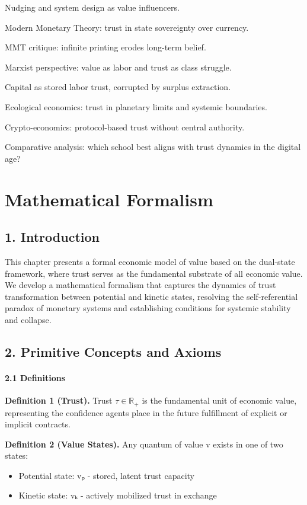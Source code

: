 \documentclass[11pt,oneside]{book}
\begin{document}
{{{{{{Nudging and system design as value influencers.

Modern Monetary Theory: trust in state sovereignty over currency.

MMT critique: infinite printing erodes long-term belief.

Marxist perspective: value as labor and trust as class struggle.

Capital as stored labor trust, corrupted by surplus extraction.

Ecological economics: trust in planetary limits and systemic boundaries.

Crypto-economics: protocol-based trust without central authority.

Comparative analysis: which school best aligns with trust dynamics in the digital age?



\appendix
\chapter{ Mathematical Formalism}

\section{1. Introduction}

This chapter presents a formal economic model of value based on the dual-state framework, where trust serves as the fundamental substrate of all economic value. We develop a mathematical formalism that captures the dynamics of trust transformation between potential and kinetic states, resolving the self-referential paradox of monetary systems and establishing conditions for systemic stability and collapse.

\section{2. Primitive Concepts and Axioms}

\subsubsection{2.1 Definitions}

\textbf{Definition 1 (Trust).} Trust $\tau \in \mathbb{R}_+$ is the fundamental unit of economic value, representing the confidence agents place in the future fulfillment of explicit or implicit contracts.

\textbf{Definition 2 (Value States).} Any quantum of value v exists in one of two states:
\begin{itemize}
\item Potential state: vₚ - stored, latent trust capacity
\item Kinetic state: vₖ - actively mobilized trust in exchange
\end{itemize}

}}}}}}
\end{document}
